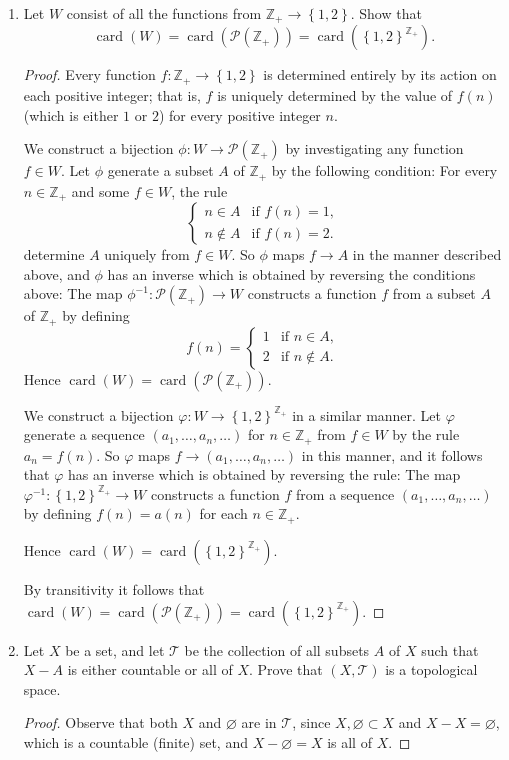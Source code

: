 \documentclass[11pt]{article}
\newcommand{\cbr}[1]{\left\{#1\right\}}
\DeclareMathOperator{\card}{card}
\begin{document}
\begin{enumerate}
    \item Let $W$ consist of all the functions from $\mathbb{Z}_+\to \cbr{1,2}$. Show that \[\card(W) = \card(\mathcal{P}(\mathbb{Z}_+)) = \card(\cbr{1,2}^{\mathbb{Z}_+}).\]
    \begin{proof}
      Every function $f\colon \mathbb{Z}_+\to \cbr{1,2}$ is determined entirely by its action on each positive integer; that is, $f$ is uniquely determined by the value of $f(n)$ (which is either $1$ or $2$) for every positive integer $n$.

      We construct a bijection $\phi\colon W\to \mathcal{P}(\mathbb{Z}_+)$ by investigating any function $f\in W$. Let $\phi$ generate a subset $A$ of $\mathbb{Z}_+$ by the following condition: For every $n\in\mathbb{Z}_+$ and some $f\in W$, the rule\[\begin{cases}
        n\in A & \text{if $f(n) = 1$},\\
        n\not\in A & \text{if $f(n) = 2$}.
      \end{cases}\] determine $A$ uniquely from $f\in W$. So $\phi$ maps $f\to A$ in the manner described above, and $\phi$ has an inverse which is obtained by reversing the conditions above: The map $\phi^{-1}\colon \mathcal{P}(\mathbb{Z}_+)\to W$ constructs a function $f$ from a subset $A$ of $\mathbb{Z}_+$ by defining \[f(n) = \begin{cases}
        1 & \text{if $n\in A$},\\
        2 & \text{if $n\not\in A$}.
      \end{cases}\]
      Hence $\card(W) = \card(\mathcal{P}(\mathbb{Z}_+))$.

      We construct a bijection $\varphi\colon W \to \cbr{1,2}^{\mathbb{Z}_+}$ in a similar manner. Let $\varphi$ generate a sequence $(a_1,\dots, a_n, \dots)$ for $n\in \mathbb{Z}_+$ from $f\in W$ by the rule $a_n = f(n)$. So $\varphi$ maps $f\to (a_1,\dots, a_n, \dots)$ in this manner, and it follows that $\varphi$ has an inverse which is obtained by reversing the rule: The map $\varphi^{-1}\colon \cbr{1,2}^{\mathbb{Z}_+}\to W$ constructs a function $f$ from a sequence $(a_1,\dots, a_n, \dots)$ by defining $f(n) = a(n)$ for each $n\in \mathbb{Z}_+$.

      Hence $\card(W) = \card(\cbr{1,2}^{\mathbb{Z}_+})$.
      
      By transitivity it follows that $\card(W) = \card(\mathcal{P}(\mathbb{Z}_+)) = \card(\cbr{1,2}^{\mathbb{Z}_+})$.
    \end{proof}
    \item Let $X$ be a set, and let $\mathcal{T}$ be the collection of all subsets $A$ of $X$ such that $X-A$ is either countable or all of $X$. Prove that $(X,\mathcal{T})$ is a topological space.
    \begin{proof}
      Observe that both $X$ and $\varnothing$ are in $\mathcal{T}$, since $X,\varnothing \subset X$ and $X-X = \varnothing$, which is a countable (finite) set, and $X-\varnothing = X$ is all of $X$.


\end{proof}
\end{enumerate}
\end{document}

